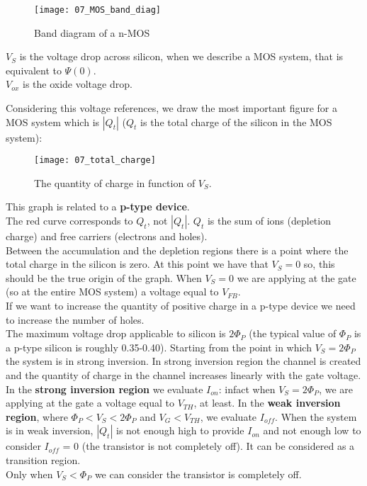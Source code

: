 \documentclass[a4paper, 12pt, twoside, openright]{report}
\begin{document}
	\begin{figure}[H]
	\centering
	\texttt{[image: 07\_MOS\_band\_diag]}
	\caption{Band diagram of a n-MOS}
	\label{}
	\end{figure}

$V_{S}$ is the voltage drop across silicon, when we describe a MOS system, that is equivalent to $\Psi(0)$.\\
$V_{ox}$ is the oxide voltage drop.

Considering this voltage references, we draw the most important figure for a MOS system which is $|Q_t|$ ($Q_{t}$ is the total charge of the silicon in the MOS system):

	\begin{figure}[H]
	\centering
	\texttt{[image: 07\_total\_charge]}
	\caption{The quantity of charge in function of $V_{S}$.}
	\label{}
	\end{figure}

This graph is related to a \textbf{p-type device}.\\
The red curve corresponds to $Q_{t}$, not $|Q_{t}|$. $Q_{t}$ is the sum of ions (depletion charge) and free carriers (electrons and holes).\\
Between the accumulation and the depletion regions there is a point where the total charge in the silicon is zero. At this point we have that $V_S = 0$ so, this should be the true origin of the graph. When $V_S = 0$ we are applying at the gate (so at the entire MOS system) a voltage equal to $V_{FB}$.\\
If we want to increase the quantity of positive charge in a p-type device we need to increase the number of holes.\\
The maximum voltage drop applicable to silicon is $2\Phi_P$ (the typical value of $\Phi_P$ is a p-type silicon is roughly 0.35-0.40). Starting from the point in which $V_S = 2\Phi_P$ the system is in strong inversion. In strong inversion region the channel is created and the quantity of charge in the channel increases linearly with the gate voltage. In the \textbf{strong inversion region} we evaluate $I_{on}$: infact when $V_S = 2\Phi_P$, we are applying at the gate a voltage equal to $V_{TH}$, at least. In the \textbf{weak inversion region}, where $ \Phi_P < V_S < 2\Phi_P$ and $V_G < V_{TH}$, we evaluate $I_{off}$. When the system is in weak inversion, $|Q_{t}|$ is not enough high to provide $I_{on}$ and not enough low to consider $I_{off}$ = 0 (the transistor is not completely off). It can be considered as a transition region.\\
Only when $V_S < \Phi_P$ we can consider the transistor is completely off.
\end{document}
